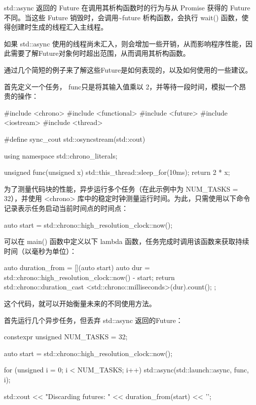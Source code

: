 std::async 返回的 Future 在调用其析构函数时的行为与从 Promise 获得的 Future 不同。当这些 Future 销毁时，会调用\~{}future 析构函数，会执行 wait() 函数，使得创建时生成的线程汇入主线程。

如果 std::async 使用的线程尚未汇入，则会增加一些开销，从而影响程序性能，因此需要了解Future对象何时超出范围，从而调用其析构函数。

通过几个简短的例子来了解这些Future是如何表现的，以及如何使用的一些建议。

首先定义一个任务， func只是将其输入值乘以 2，并等待一段时间，模拟一个昂贵的操作：

\begin{cpp}
#include <chrono>
#include <functional>
#include <future>
#include <iostream>
#include <thread>

#define sync_cout std::osyncstream(std::cout)

using namespace std::chrono_literals;

unsigned func(unsigned x) {
    std::this_thread::sleep_for(10ms);
    return 2 * x;
}
\end{cpp}

为了测量代码块的性能，异步运行多个任务（在此示例中为 NUM\_TASKS = 32），并使用 <chrono> 库中的稳定时钟测量运行时间。为此，只需使用以下命令记录表示任务启动当前时间点的时间点：

\begin{cpp}
auto start = std::chrono::high_resolution_clock::now();
\end{cpp}

可以在 main() 函数中定义以下 lambda 函数，任务完成时调用该函数来获取持续时间（以毫秒为单位）：

\begin{cpp}
auto duration_from = [](auto start) {
    auto dur = std::chrono::high_resolution_clock::now()
                - start;
    return std::chrono::duration_cast
                <std::chrono::milliseconds>(dur).count();
};
\end{cpp}

这个代码，就可以开始衡量未来的不同使用方法。

首先运行几个异步任务，但丢弃 std::async 返回的Future：

\begin{cpp}
constexpr unsigned NUM_TASKS = 32;

auto start = std::chrono::high_resolution_clock::now();

for (unsigned i = 0; i < NUM_TASKS; i++) {
    std::async(std::launch::async, func, i);
}

std::cout << "Discarding futures: "
          << duration_from(start) << '\n';
\end{cpp}

